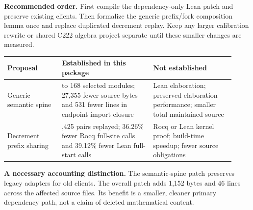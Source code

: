 \begin{abstract}
The most useful next simplifications are to remove legacy quotient adapters from Lean's primary semantic dependency path, and to share the branch-independent prefix of each decrement certificate before its zero/nonzero oracle split. Both retain the exact K215 machine and existing endpoint statements. At the pinned sources, an uncompiled 12-file Lean patch reduces the selected endpoint closure from 174 to 168 modules, removing 531 lines from that closure while retaining compatibility wrappers. A new finite diagnostic checks all 1,425 decrement pairs. Sharing reduces abstract replay calls from 1,337,729 to 852,647 in the Rocq full-site path and from 514,073 to 312,947 in the Lean full-start path. These are static and finite results, not new kernel checks or measured build-time improvements. The archive contains the proposed patch, candidate interfaces, pinned input data, new checkers, and an immutable integrity manifest.
\end{abstract}

\textbf{Recommended order.} First compile the dependency-only Lean patch and preserve existing clients. Then formalize the generic prefix/fork composition lemma once and replace duplicated decrement replay. Keep any larger calibration rewrite or shared C222 algebra project separate until these smaller changes are measured.

\begin{center}
\begin{tabular}{@{}>{\raggedright\arraybackslash}p{0.22\linewidth}>{\raggedright\arraybackslash}p{0.37\linewidth}>{\raggedright\arraybackslash}p{0.33\linewidth}@{}}
\toprule
Proposal & Established in this package & Not established \\
\midrule
Generic semantic spine & 174 to 168 selected modules; 27,355 fewer source bytes and 531 fewer lines in endpoint import closure & Lean elaboration; preserved elaboration performance; smaller total maintained source \\
\addlinespace
Decrement prefix sharing & 1,425 pairs replayed; 36.26\% fewer Rocq full-site calls and 39.12\% fewer Lean full-start calls & Rocq or Lean kernel proof; build-time speedup; fewer source obligations \\
\bottomrule
\end{tabular}
\end{center}

\textbf{A necessary accounting distinction.} The semantic-spine patch preserves legacy adapters for old clients. The overall patch adds 1,152 bytes and 46 lines across the affected source files. Its benefit is a smaller, cleaner primary dependency path, not a claim of deleted mathematical content.
